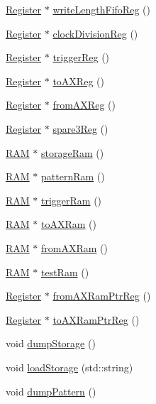 \begin{DoxyCompactItemize}
\item 
\hyperlink{classRegister}{Register} $\ast$ \hyperlink{classA3PE_a3b75531731fc939206cce076f7ac9f9a}{write\+Length\+Fifo\+Reg} ()
\item 
\hyperlink{classRegister}{Register} $\ast$ \hyperlink{classA3PE_a10cf30ff852d7580ba94dbee0c48e0d5}{clock\+Division\+Reg} ()
\item 
\hyperlink{classRegister}{Register} $\ast$ \hyperlink{classA3PE_a4bf922f391fee6753fb0d53e133603b7}{trigger\+Reg} ()
\item 
\hyperlink{classRegister}{Register} $\ast$ \hyperlink{classA3PE_a43b0006fafa3aeae353abb2ac30e872c}{to\+A\+X\+Reg} ()
\item 
\hyperlink{classRegister}{Register} $\ast$ \hyperlink{classA3PE_a0b2fabe7e7941f33de210d9385b7afce}{from\+A\+X\+Reg} ()
\item 
\hyperlink{classRegister}{Register} $\ast$ \hyperlink{classA3PE_a979a9ac462eb55e611f6de4e94bad18e}{spare3\+Reg} ()
\item 
\hyperlink{classRAM}{R\+AM} $\ast$ \hyperlink{classA3PE_af241373059bad4a3c376ab2ac98a7b29}{storage\+Ram} ()
\item 
\hyperlink{classRAM}{R\+AM} $\ast$ \hyperlink{classA3PE_a94ef54086baa29f7f6638c13d8906e56}{pattern\+Ram} ()
\item 
\hyperlink{classRAM}{R\+AM} $\ast$ \hyperlink{classA3PE_aad0f7ac467db22e5608ae6b0957665a1}{trigger\+Ram} ()
\item 
\hyperlink{classRAM}{R\+AM} $\ast$ \hyperlink{classA3PE_a16b16ac12705b9dd93d70fa172deb584}{to\+A\+X\+Ram} ()
\item 
\hyperlink{classRAM}{R\+AM} $\ast$ \hyperlink{classA3PE_a7c9026a74c1954b2d250be05fbc1c8c5}{from\+A\+X\+Ram} ()
\item 
\hyperlink{classRAM}{R\+AM} $\ast$ \hyperlink{classA3PE_a9327d0bd2efb5baa7c6b7de27bbc5997}{test\+Ram} ()
\item 
\hyperlink{classRegister}{Register} $\ast$ \hyperlink{classA3PE_aad21357e25e3d4e2bed779040de52e13}{from\+A\+X\+Ram\+Ptr\+Reg} ()
\item 
\hyperlink{classRegister}{Register} $\ast$ \hyperlink{classA3PE_af6e9e980e871fcf0e1b35e1b4ae95ebe}{to\+A\+X\+Ram\+Ptr\+Reg} ()
\item 
void \hyperlink{classA3PE_ad7999557f9d561dec67526730a3c97ef}{dump\+Storage} ()
\item 
void \hyperlink{classA3PE_a8bd4a7a5dd8219f93386756c24a0f0b5}{load\+Storage} (std\+::string)
\item 
void \hyperlink{classA3PE_a23da04d3c7e632dfb64e5ed4e21a21f3}{dump\+Pattern} ()

\end{DoxyCompactItemize}
